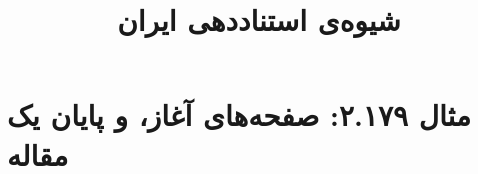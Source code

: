 \documentclass[a4paper,10pt]{article}
\begin{document}
\title{شیوه‌ی استناددهی ایران
 }
\author{}
\date{}
\maketitle



\section*{مثال ۲.۱۷۹: صفحه‌های آغاز، و پایان یک مقاله}

\cite{گزنی1379}\\
\cite{hlatky2002}\\






\end{document}
